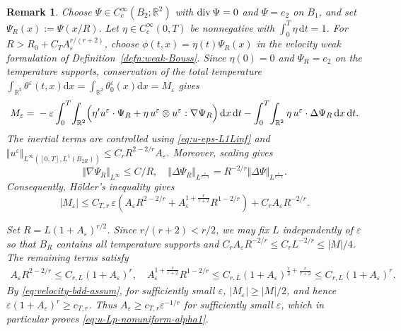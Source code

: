 \documentclass[reqno,11pt,a4paper]{amsart}
\newtheorem{remark}[theorem]{Remark}
\newcommand{\dd}{\mathrm{d}}
\renewcommand{\div}{{\rm div\,}}
\begin{document}
\begin{remark}
Choose $\Psi\in C_c^\infty(B_2;\mathbb R^2)$ with
$\div\Psi=0$ and $\Psi=e_2$ on $B_1$,
and set $\Psi_R(x):=\Psi(x/R)$.
Let $\eta\in C_c^\infty(0,T)$ be nonnegative with
$\int_0^T\eta\,\dd t=1$.
For $R>R_0+C_TA_\varepsilon^{r/(r+2)}$,
choose $\phi(t,x)=\eta(t)\Psi_R(x)$
in the velocity weak formulation of
Definition~\ref{defn:weak-Bouss}.
Since $\eta(0)=0$ and $\Psi_R=e_2$
on the temperature supports,
conservation of the total temperature 
$\int_{\mathbb{R}^2} \theta^\varepsilon(t,x)\dd x = \int_{\mathbb{R}^2} \theta^\varepsilon_0(x) \dd x =M_\varepsilon$ gives
\begin{align*}
  M_\varepsilon
  ={}
  -\varepsilon\int_0^T\!\int_{\mathbb R^2}
  \Bigl(
    \eta' u^\varepsilon\cdot\Psi_R
    +\eta\,u^\varepsilon\otimes u^\varepsilon:
      \nabla\Psi_R
  \Bigr)\,\dd x\,\dd t
  -\int_0^T\!\int_{\mathbb R^2}
    \eta\,u^\varepsilon\cdot\Delta\Psi_R
    \,\dd x\,\dd t.
\end{align*}
The inertial terms are controlled using \eqref{eq:u-eps-L1Linf} and 
$\Vert u^\varepsilon\Vert _{L^\infty([0,T],L^1(B_{2R}))}
\leq C_rR^{2-2/r}A_\varepsilon$. 
Moreover, scaling gives
\[
  \Vert \nabla\Psi_R\Vert _{L^\infty}\leq C/R,
  \quad
  \Vert \Delta\Psi_R\Vert _{L^{\frac{r}{r-1}}}
  =R^{-2/r}\Vert \Delta\Psi\Vert _{L^{\frac{r}{r-1}}}.
\]
Consequently, H\"older's inequality gives
\[
  |M_\varepsilon|
  \leq C_{T,r}\,\varepsilon
  \left(
    A_\varepsilon R^{2-2/r}
    +A_\varepsilon^{1+\frac r{r+2}}R^{1-2/r}
  \right)
  +C_rA_\varepsilon R^{-2/r}.
\]

Set $R=L(1+A_\varepsilon)^{r/2}$.
Since $r/(r+2)<r/2$, we may fix $L$ independently
of $\varepsilon$ so that $B_R$ contains all
temperature supports and $C_rA_\varepsilon R^{-2/r}
  \leq C_rL^{-2/r}\leq |M|/4$. 
The remaining terms satisfy
\begin{align*}
  A_\varepsilon R^{2-2/r}
  \leq C_{r,L}(1+A_\varepsilon)^r,\quad
  A_\varepsilon^{1+\frac r{r+2}}R^{1-2/r}
  \leq
  C_{r,L}(1+A_\varepsilon)^{\frac r2+\frac r{r+2}}
  \leq C_{r,L}(1+A_\varepsilon)^r.
\end{align*}
By \eqref{eq:velocity-bdd-assum}, for sufficiently small $\varepsilon$,
$|M_\varepsilon|\geq|M|/2$, and hence $\varepsilon(1+A_\varepsilon)^r\geq c_{T,r}$. 
Thus
$A_\varepsilon\geq c_{T,r}\varepsilon^{-1/r}$
for sufficiently small $\varepsilon$,
which in particular proves
\eqref{eq:u-Lp-nonuniform-alpha1}.
\end{remark}
\end{document}
